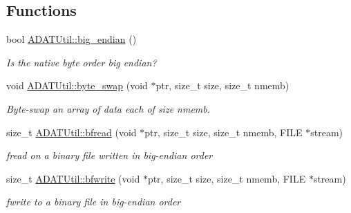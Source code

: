 \subsection*{Functions}
\begin{DoxyCompactItemize}
\item 
bool \mbox{\hyperlink{namespaceADATUtil_a7f9f0561f3ffcb562067ebedbade089f}{A\+D\+A\+T\+Util\+::big\+\_\+endian}} ()
\begin{DoxyCompactList}\small\item\em Is the native byte order big endian? \end{DoxyCompactList}\item 
void \mbox{\hyperlink{namespaceADATUtil_af522573b90be52b1e09342dd11e23199}{A\+D\+A\+T\+Util\+::byte\+\_\+swap}} (void $\ast$ptr, size\+\_\+t size, size\+\_\+t nmemb)
\begin{DoxyCompactList}\small\item\em Byte-\/swap an array of data each of size nmemb. \end{DoxyCompactList}\item 
size\+\_\+t \mbox{\hyperlink{namespaceADATUtil_af41a672c512fa9828e3ada70420985c9}{A\+D\+A\+T\+Util\+::bfread}} (void $\ast$ptr, size\+\_\+t size, size\+\_\+t nmemb, F\+I\+LE $\ast$stream)
\begin{DoxyCompactList}\small\item\em fread on a binary file written in big-\/endian order \end{DoxyCompactList}\item 
size\+\_\+t \mbox{\hyperlink{namespaceADATUtil_afcbd366717135244eee5acb0d5ba86ac}{A\+D\+A\+T\+Util\+::bfwrite}} (void $\ast$ptr, size\+\_\+t size, size\+\_\+t nmemb, F\+I\+LE $\ast$stream)
\begin{DoxyCompactList}\small\item\em fwrite to a binary file in big-\/endian order \end{DoxyCompactList}\end{DoxyCompactItemize}
